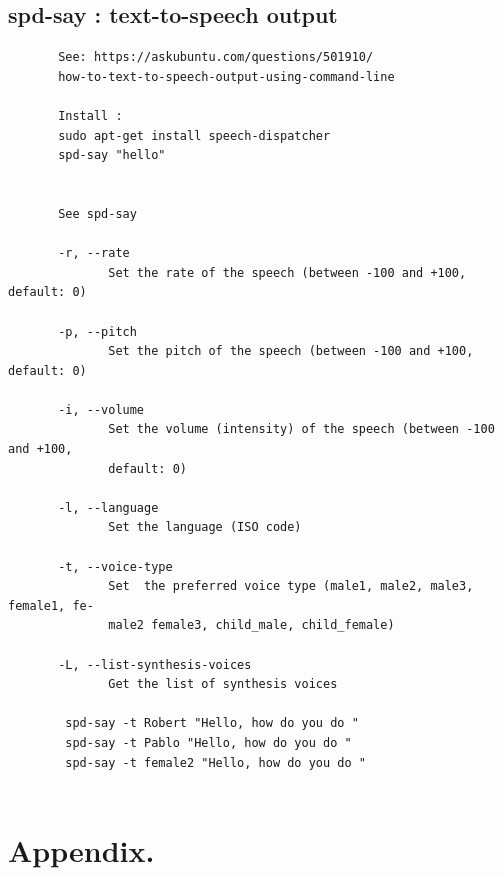 \documentclass[a4paper,12pt]{article}
\begin{document}
\subsection{spd-say : text-to-speech output  }
\begin{verbatim}
       See: https://askubuntu.com/questions/501910/
       how-to-text-to-speech-output-using-command-line        
       
       Install : 
       sudo apt-get install speech-dispatcher
       spd-say "hello"
       
       
       See spd-say

       -r, --rate
              Set the rate of the speech (between -100 and +100, default: 0)

       -p, --pitch
              Set the pitch of the speech (between -100 and +100, default: 0)

       -i, --volume
              Set the volume (intensity) of the speech (between -100 and +100,
              default: 0)
              
       -l, --language
              Set the language (ISO code)
       
       -t, --voice-type
              Set  the preferred voice type (male1, male2, male3, female1, fe‐
              male2 female3, child_male, child_female)
              
       -L, --list-synthesis-voices
              Get the list of synthesis voices
              
        spd-say -t Robert "Hello, how do you do "      
        spd-say -t Pablo "Hello, how do you do "
        spd-say -t female2 "Hello, how do you do "
                
\end{verbatim}




\section{Appendix.}
\end{document}
